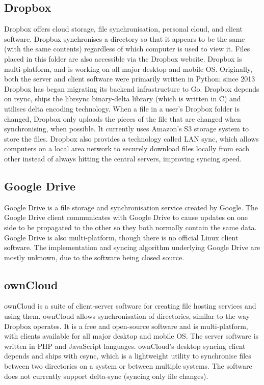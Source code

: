   \subsection{Dropbox}
    Dropbox offers cloud storage, file synchronisation, personal cloud, and client software. Dropbox synchronises a directory so that it appears to be the same (with the same contents) regardless of which computer is used to view it. Files placed in this folder are also accessible via the Dropbox website. Dropbox is multi-platform, and is working on all major desktop and mobile OS. Originally, both the server and client software were primarily written in Python; since 2013 Dropbox has began migrating its backend infrastructure to Go. Dropbox depends on rsync, ships the librsync binary-delta library (which is written in C) and utilises delta encoding technology. When a file in a user's Dropbox folder is changed, Dropbox only uploads the pieces of the file that are changed when synchronising, when possible. It currently uses Amazon's S3 storage system to store the files. Dropbox also provides a technology called LAN sync, which allows computers on a local area network to securely download files locally from each other instead of always hitting the central servers, improving syncing speed.

  \subsection{Google Drive}
    Google Drive is a file storage and synchronisation service created by Google. The Google Drive client communicates with Google Drive to cause updates on one side to be propagated to the other so they both normally contain the same data. Google Drive is also multi-platform, though there is no official Linux client software. The implementation and syncing algorithm underlying Google Drive are mostly unknown, due to the software being closed source.

  \subsection{ownCloud}
    \label{sec:owncloud}
    ownCloud\cite{owncloud} is a suite of client-server software for creating file hosting services and using them. ownCloud allows synchronisation of directories, similar to the way Dropbox operates. It is a free and open-source software and is multi-platform, with clients available for all major desktop and mobile OS. The server software is written in PHP and JavaScript languages. ownCloud's desktop syncing client depends and ships with csync\cite{csync}, which is a lightweight utility to synchronise files between two directories on a system or between multiple systems. The software does not currently support delta-sync (syncing only file changes).



